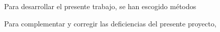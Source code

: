 Para desarrollar el presente trabajo, se han escogido métodos 

Para complementar y corregir las deficiencias del presente proyecto,
